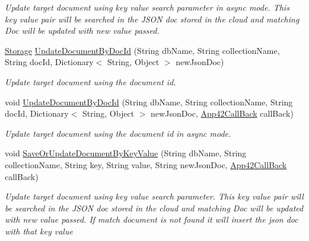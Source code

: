 \begin{DoxyCompactItemize}
\begin{DoxyCompactList}\small\item\em Update target document using key value search parameter in async mode. This key value pair will be searched in the J\+S\+O\+N doc stored in the cloud and matching Doc will be updated with new value passed. \end{DoxyCompactList}\item 
\hyperlink{classcom_1_1shephertz_1_1app42_1_1paas_1_1sdk_1_1csharp_1_1storage_1_1_storage}{Storage} \hyperlink{classcom_1_1shephertz_1_1app42_1_1paas_1_1sdk_1_1csharp_1_1storage_1_1_storage_service_a875ba45cadce0010ff5e9aa2352920f4}{Update\+Document\+By\+Doc\+Id} (String db\+Name, String collection\+Name, String doc\+Id, Dictionary$<$ String, Object $>$ new\+Json\+Doc)
\begin{DoxyCompactList}\small\item\em Update target document using the document id. \end{DoxyCompactList}\item 
void \hyperlink{classcom_1_1shephertz_1_1app42_1_1paas_1_1sdk_1_1csharp_1_1storage_1_1_storage_service_aadd96c123cf841497fee3ba7b04646ef}{Update\+Document\+By\+Doc\+Id} (String db\+Name, String collection\+Name, String doc\+Id, Dictionary$<$ String, Object $>$ new\+Json\+Doc, \hyperlink{interfacecom_1_1shephertz_1_1app42_1_1paas_1_1sdk_1_1csharp_1_1_app42_call_back}{App42\+Call\+Back} call\+Back)
\begin{DoxyCompactList}\small\item\em Update target document using the document id in async mode. \end{DoxyCompactList}\item 
void \hyperlink{classcom_1_1shephertz_1_1app42_1_1paas_1_1sdk_1_1csharp_1_1storage_1_1_storage_service_ab161aee11909e49ef9508f44e5c453c6}{Save\+Or\+Update\+Document\+By\+Key\+Value} (String db\+Name, String collection\+Name, String key, String value, String new\+Json\+Doc, \hyperlink{interfacecom_1_1shephertz_1_1app42_1_1paas_1_1sdk_1_1csharp_1_1_app42_call_back}{App42\+Call\+Back} call\+Back)
\begin{DoxyCompactList}\small\item\em Update target document using key value search parameter. This key value pair will be searched in the J\+S\+O\+N doc stored in the cloud and matching Doc will be updated with new value passed. If match document is not found it will insert the json doc with that key value \end{DoxyCompactList}\item 

\end{DoxyCompactItemize}
